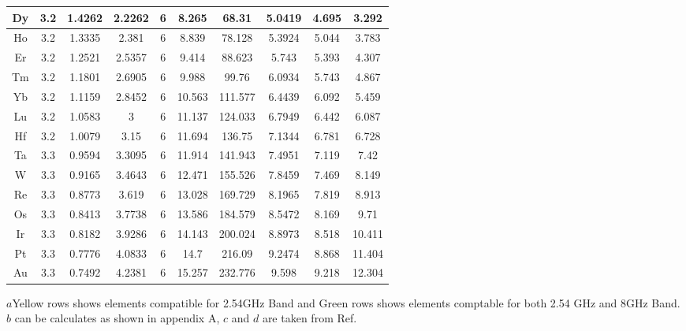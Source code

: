 \documentclass[journal]{IEEEtran}
\begin{document}
{\begin{longtable}{|c|c|c|c|c|c|c|c|c|c|}
			\hline
		\rowcolor{yellow!50}	Dy       & 3.2 & 1.4262 & 2.2262 & 6 & 8.265  & 68.31   & 5.0419  & 4.695  & 3.292   \\
			\hline
		\rowcolor{yellow!50}	Ho       & 3.2 & 1.3335 & 2.381  & 6 & 8.839  & 78.128  & 5.3924  & 5.044  & 3.783   \\	
		\hline
		\rowcolor{yellow!50}	Er       & 3.2 & 1.2521 & 2.5357 & 6 & 9.414  & 88.623  & 5.743   & 5.393  & 4.307   \\
			\hline
		\rowcolor{yellow!50}	Tm       & 3.2 & 1.1801 & 2.6905 & 6 & 9.988  & 99.76   & 6.0934  & 5.743  & 4.867   \\
			\hline
		\rowcolor{yellow!50}	Yb       & 3.2 & 1.1159 & 2.8452 & 6 & 10.563 & 111.577 & 6.4439  & 6.092  & 5.459   \\
			\hline
		\rowcolor{yellow!50}	Lu       & 3.2 & 1.0583 & 3      & 6 & 11.137 & 124.033 & 6.7949  & 6.442  & 6.087   \\
			\hline
		\rowcolor{yellow!50}	Hf       & 3.2 & 1.0079 & 3.15   & 6 & 11.694 & 136.75  & 7.1344  & 6.781  & 6.728   \\
			\hline
		\rowcolor{yellow!50}	Ta       & 3.3 & 0.9594 & 3.3095 & 6 & 11.914 & 141.943 & 7.4951  & 7.119  & 7.42    \\
			\hline
		\rowcolor{yellow!50}	W        & 3.3 & 0.9165 & 3.4643 & 6 & 12.471 & 155.526 & 7.8459  & 7.469  & 8.149   \\
			\hline
		\rowcolor{yellow!50}	Re       & 3.3 & 0.8773 & 3.619  & 6 & 13.028 & 169.729 & 8.1965  & 7.819  & 8.913   \\
			\hline
		\rowcolor{yellow!50}	Os       & 3.3 & 0.8413 & 3.7738 & 6 & 13.586 & 184.579 & 8.5472  & 8.169  & 9.71    \\
			\hline
		\rowcolor{yellow!50}	Ir       & 3.3 & 0.8182 & 3.9286 & 6 & 14.143 & 200.024 & 8.8973  & 8.518  & 10.411  \\
			\hline
		\rowcolor{yellow!50}
	
			Pt       & 3.3 & 0.7776 & 4.0833 & 6 & 14.7   & 216.09  & 9.2474  & 8.868  & 11.404  \\
			\hline
		\rowcolor{yellow!50}	Au       & 3.3 & 0.7492 & 4.2381 & 6 & 15.257 & 232.776 & 9.598   & 9.218  & 12.304 \\
		\hline
	
	\end{longtable}

}
	\footnotesize{$a$Yellow rows shows elements compatible for 2.54GHz Band and Green rows shows elements comptable for both 2.54 GHz and 8GHz Band.
	$b$ can be calculates as shown in appendix A, $c$ and $d$ are taken from Ref. \cite{ghosh2002theoretical}}
	
\end{document}
